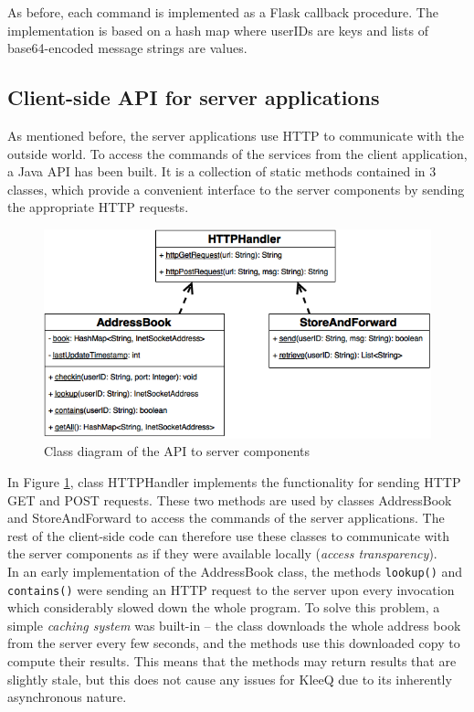 \documentclass[a4paper, 12pt]{report}
\begin{document}
As before, each command is implemented as a Flask callback procedure. The implementation is based on a hash map where userIDs are keys and lists of base64-encoded message strings are values.


\subsection{Client-side API for server applications}
As mentioned before, the server applications use HTTP to communicate with the outside world. To access the commands of the services from the client application, a Java API has been built. It is a collection of static methods contained in 3 classes, which provide a convenient interface to the server components by sending the appropriate HTTP requests.

\begin{figure}[H]
    \centering
    \includegraphics[width = 0.7 \linewidth]{pics/scaffolding_uml.png}
    \caption{\label{fig:scaffolding_uml} Class diagram of the API to server components}
\end{figure}
In Figure \ref{fig:scaffolding_uml}, class HTTPHandler implements the functionality for sending HTTP GET and POST requests. These two methods are used by classes AddressBook and StoreAndForward to access the commands of the server applications. The rest of the client-side code can therefore use these classes to communicate with the server components as if they were available locally (\emph{access transparency}). \\

In an early implementation of the AddressBook class, the methods \texttt{lookup()} and \texttt{contains()} were sending an HTTP request to the server upon every invocation which considerably slowed down the whole program. To solve this problem, a simple \emph{caching system} was built-in -- the class downloads the whole address book from the server every few seconds, and the methods use this downloaded copy to compute their results. This means that the methods may return results that are slightly stale, but this does not cause any issues for KleeQ due to its inherently asynchronous nature. \\
\end{document}
